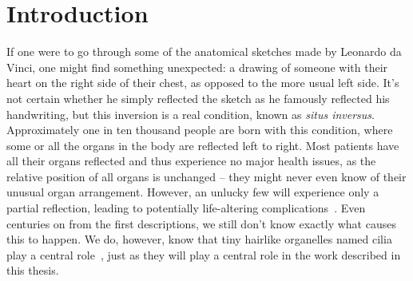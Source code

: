 \setchapterpreamble[u]{\optmargintoc}
\chapter{Introduction}


If one were to go through some of the anatomical sketches made by Leonardo da Vinci, one might find something unexpected: a drawing of someone with their heart on the right side of their chest, as opposed to the more usual left side. It's not certain whether he simply reflected the sketch as he famously reflected his handwriting, but this inversion is a real condition, known as \textit{situs inversus}.
Approximately one in ten thousand people are born with this condition, where some or all the organs in the body are reflected left to right. Most patients have all their organs reflected and thus experience no major health issues, as the relative position of all organs is unchanged -- they might never even know of their unusual organ arrangement. 
However, an unlucky few will experience only a partial reflection, leading to potentially life-altering complications~. Even centuries on from the first descriptions, we still don't know exactly what causes this to happen. We do, however, know that tiny hairlike organelles named cilia play a central role~, just as they will play a central role in the work described in this thesis.

